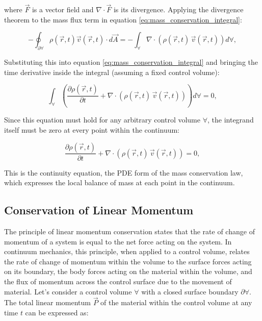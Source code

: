 \documentclass[12pt,a4paper,english]{article}
\begin{document}
\noindent
where $\vec{F}$ is a vector field and $\nabla \cdot \vec{F}$ is its divergence. Applying the divergence theorem to the mass flux term in equation \ref{eq:mass_conservation_integral}:

\begin{equation}
-\oint_{\partial \forall} \rho(\vec{r}, t) \vec{v}(\vec{r}, t) \cdot d\vec{A} = -\int_{\forall} \nabla \cdot (\rho(\vec{r}, t) \, \vec{v}(\vec{r}, t)) d\forall,
\end{equation}

\noindent
Substituting this into equation \ref{eq:mass_conservation_integral} and bringing the time derivative inside the integral (assuming a fixed control volume):

\begin{equation}
\int_{\forall} \left( \frac{\partial \rho(\vec{r}, t)}{\partial t} + \nabla \cdot (\rho(\vec{r}, t) \, \vec{v}(\vec{r}, t)) \right) d\forall = 0,
\end{equation}

\noindent
Since this equation must hold for any arbitrary control volume $\forall$, the integrand itself must be zero at every point within the continuum:

\begin{equation}\label{eq:mass_conservation_pde}
\frac{\partial \rho(\vec{r}, t)}{\partial t} + \nabla \cdot (\rho(\vec{r}, t) \, \vec{v}(\vec{r}, t)) = 0,
\end{equation}

\noindent
This is the continuity equation, the PDE form of the mass conservation law, which expresses the local balance of mass at each point in the continuum.

\subsection{Conservation of Linear Momentum}

The principle of linear momentum conservation states that the rate of change of momentum of a system is equal to the net force acting on the system. In continuum mechanics, this principle, when applied to a control volume, relates the rate of change of momentum within the volume to the surface forces acting on its boundary, the body forces acting on the material within the volume, and the flux of momentum across the control surface due to the movement of material. Let's consider a control volume $\forall$ with a closed surface boundary $\partial \forall$. The total linear momentum $\vec{P}$ of the material within the control volume at any time $t$ can be expressed as:
\end{document}
